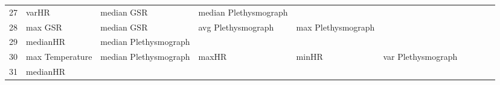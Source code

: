 \begin{landscape}
\begin{table}[]
\begin{tabular}{l|llllllll}
27       & varHR                   & median GSR            & median Plethysmograph   &                         &                         &                       &                      &          &                      &        \\
28       & max GSR                 & median GSR            & avg Plethysmograph      & max Plethysmograph      &                         &                       &                      &          &                      &        \\
29       & medianHR                & median Plethysmograph &                         &                         &                         &                       &                      &          &                      &        \\
30       & max Temperature         & median Plethysmograph & maxHR                   & minHR                   & var Plethysmograph      &                       &                      &          &                      &        \\
31       & medianHR                &                       &                         &                         &                         &                       &                      &          &                      &        \\
\end{tabular}
\end{table}
\end{landscape}
\clearpage

